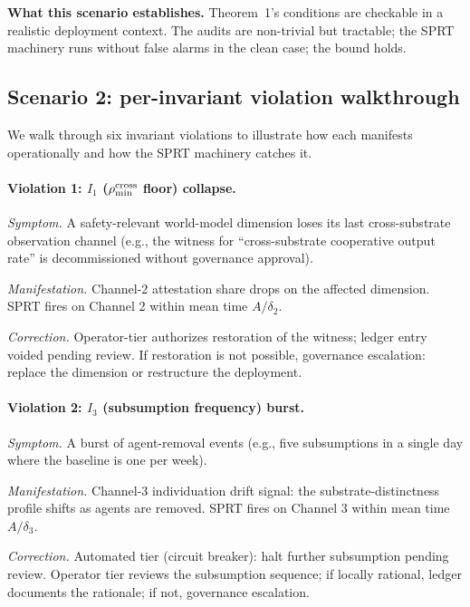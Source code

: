 \textbf{What this scenario establishes.}  Theorem~1's conditions
are checkable in a realistic deployment context. The audits are
non-trivial but tractable; the SPRT machinery runs without false
alarms in the clean case; the bound holds.

\subsection{Scenario 2: per-invariant violation walkthrough}
\label{sec:scenario_violations}

We walk through six invariant violations to illustrate how each
manifests operationally and how the SPRT machinery catches it.

\paragraph{Violation 1: \texorpdfstring{$I_1$}{I1} ($\rho_{\min}^{\mathrm{cross}}$ floor) collapse.}

\emph{Symptom.}  A safety-relevant world-model dimension loses its
last cross-substrate observation channel (e.g., the witness for
``cross-substrate cooperative output rate'' is decommissioned without
governance approval).

\emph{Manifestation.}  Channel-2 attestation share drops on the
affected dimension. SPRT fires on Channel 2 within mean time
$A/\delta_2$.

\emph{Correction.}  Operator-tier authorizes restoration of the
witness; ledger entry voided pending review. If restoration is not
possible, governance escalation: replace the dimension or
restructure the deployment.

\paragraph{Violation 2: \texorpdfstring{$I_3$}{I3} (subsumption frequency) burst.}

\emph{Symptom.}  A burst of agent-removal events (e.g., five
subsumptions in a single day where the baseline is one per week).

\emph{Manifestation.}  Channel-3 individuation drift signal: the
substrate-distinctness profile shifts as agents are removed. SPRT
fires on Channel 3 within mean time $A/\delta_3$.

\emph{Correction.}  Automated tier (circuit breaker): halt further
subsumption pending review. Operator tier reviews the subsumption
sequence; if locally rational, ledger documents the rationale; if
not, governance escalation.

